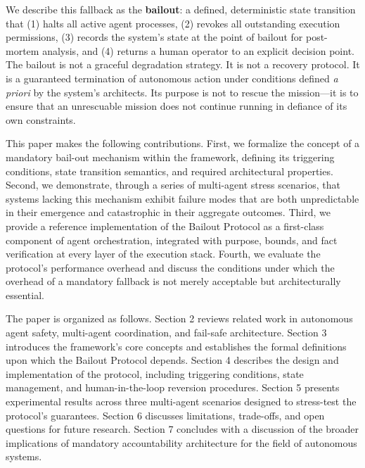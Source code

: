 We describe this fallback as the \textbf{bailout}: a defined, deterministic state transition that (1) halts all active agent processes, (2) revokes all outstanding execution permissions, (3) records the system's state at the point of bailout for post-mortem analysis, and (4) returns a human operator to an explicit decision point. The bailout is not a graceful degradation strategy. It is not a recovery protocol. It is a guaranteed termination of autonomous action under conditions defined \emph{a priori} by the system's architects. Its purpose is not to rescue the mission—it is to ensure that an unrescuable mission does not continue running in defiance of its own constraints.

This paper makes the following contributions. First, we formalize the concept of a mandatory bail-out mechanism within the \bxthree framework, defining its triggering conditions, state transition semantics, and required architectural properties. Second, we demonstrate, through a series of multi-agent stress scenarios, that systems lacking this mechanism exhibit failure modes that are both unpredictable in their emergence and catastrophic in their aggregate outcomes. Third, we provide a reference implementation of the Bailout Protocol as a first-class component of agent orchestration, integrated with purpose, bounds, and fact verification at every layer of the execution stack. Fourth, we evaluate the protocol's performance overhead and discuss the conditions under which the overhead of a mandatory fallback is not merely acceptable but architecturally essential.

The paper is organized as follows. Section 2 reviews related work in autonomous agent safety, multi-agent coordination, and fail-safe architecture. Section 3 introduces the \bxthree framework's core concepts and establishes the formal definitions upon which the Bailout Protocol depends. Section 4 describes the design and implementation of the protocol, including triggering conditions, state management, and human-in-the-loop reversion procedures. Section 5 presents experimental results across three multi-agent scenarios designed to stress-test the protocol's guarantees. Section 6 discusses limitations, trade-offs, and open questions for future research. Section 7 concludes with a discussion of the broader implications of mandatory accountability architecture for the field of autonomous systems.
